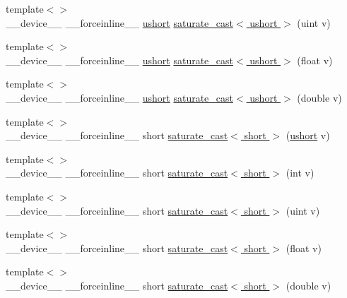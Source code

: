 \begin{DoxyCompactItemize}
\item 
{\footnotesize template$<$$>$ }\\\-\_\-\-\_\-device\-\_\-\-\_\- \-\_\-\-\_\-forceinline\-\_\-\-\_\- \hyperlink{core_2types__c_8h_ab95f123a6c9bcfee6a343170ef8c5f69}{ushort} \hyperlink{namespacecv_1_1gpu_1_1device_a6f8308e1f17a7c867523c073af91bb54}{saturate\-\_\-cast$<$ ushort $>$} (uint v)
\item 
{\footnotesize template$<$$>$ }\\\-\_\-\-\_\-device\-\_\-\-\_\- \-\_\-\-\_\-forceinline\-\_\-\-\_\- \hyperlink{core_2types__c_8h_ab95f123a6c9bcfee6a343170ef8c5f69}{ushort} \hyperlink{namespacecv_1_1gpu_1_1device_a4981a847a99d5cf4f61f4ecb933ebe78}{saturate\-\_\-cast$<$ ushort $>$} (float v)
\item 
{\footnotesize template$<$$>$ }\\\-\_\-\-\_\-device\-\_\-\-\_\- \-\_\-\-\_\-forceinline\-\_\-\-\_\- \hyperlink{core_2types__c_8h_ab95f123a6c9bcfee6a343170ef8c5f69}{ushort} \hyperlink{namespacecv_1_1gpu_1_1device_ad5f8ecff7c6eec5b6d90ec2cc550fd2b}{saturate\-\_\-cast$<$ ushort $>$} (double v)
\item 
{\footnotesize template$<$$>$ }\\\-\_\-\-\_\-device\-\_\-\-\_\- \-\_\-\-\_\-forceinline\-\_\-\-\_\- short \hyperlink{namespacecv_1_1gpu_1_1device_aaec9239f457ba9ff62693a426d5bbb5a}{saturate\-\_\-cast$<$ short $>$} (\hyperlink{core_2types__c_8h_ab95f123a6c9bcfee6a343170ef8c5f69}{ushort} v)
\item 
{\footnotesize template$<$$>$ }\\\-\_\-\-\_\-device\-\_\-\-\_\- \-\_\-\-\_\-forceinline\-\_\-\-\_\- short \hyperlink{namespacecv_1_1gpu_1_1device_ab1945c25a8ae7f2a87eda97ddc78f341}{saturate\-\_\-cast$<$ short $>$} (int v)
\item 
{\footnotesize template$<$$>$ }\\\-\_\-\-\_\-device\-\_\-\-\_\- \-\_\-\-\_\-forceinline\-\_\-\-\_\- short \hyperlink{namespacecv_1_1gpu_1_1device_a907aee3278f87a8848eb40b54649c4e9}{saturate\-\_\-cast$<$ short $>$} (uint v)
\item 
{\footnotesize template$<$$>$ }\\\-\_\-\-\_\-device\-\_\-\-\_\- \-\_\-\-\_\-forceinline\-\_\-\-\_\- short \hyperlink{namespacecv_1_1gpu_1_1device_a65b17da0032ed40fce874bf49e5a0068}{saturate\-\_\-cast$<$ short $>$} (float v)
\item 
{\footnotesize template$<$$>$ }\\\-\_\-\-\_\-device\-\_\-\-\_\- \-\_\-\-\_\-forceinline\-\_\-\-\_\- short \hyperlink{namespacecv_1_1gpu_1_1device_a36b24997a58cf59bcd10c7edb56baa4d}{saturate\-\_\-cast$<$ short $>$} (double v)

\end{DoxyCompactItemize}
